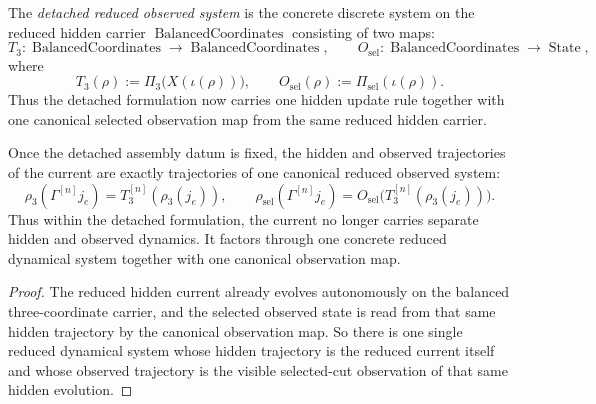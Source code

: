 \begin{definition}
\label{def:detached-reduced-observed-system}
The \emph{detached reduced observed system} is the concrete discrete system on
the reduced hidden carrier \(\operatorname{BalancedCoordinates}\) consisting of
two maps:
\[
T_3 : \operatorname{BalancedCoordinates}\to\operatorname{BalancedCoordinates},
\qquad
O_{\mathrm{sel}} : \operatorname{BalancedCoordinates}\to\operatorname{State},
\]
where
\[
T_3(\rho):=\Pi_3\!\bigl(X(\iota(\rho))\bigr),
\qquad
O_{\mathrm{sel}}(\rho):=\Pi_{\mathrm{sel}}(\iota(\rho)).
\]
Thus the detached formulation now carries one hidden update rule together with
one canonical selected observation map from the same reduced hidden carrier.
\end{definition}

\begin{corollary}
\label{thm:detached-current-trajectories-factor-through-the-reduced-observed-system}
Once the detached assembly datum is fixed, the hidden and observed trajectories
of the current are exactly trajectories of one canonical reduced observed
system:
\[
\rho_3(\Gamma^{[n]} j_e)=T_3^{[n]}(\rho_3(j_e)),
\qquad
\rho_{\mathrm{sel}}(\Gamma^{[n]} j_e)=
O_{\mathrm{sel}}\!\bigl(T_3^{[n]}(\rho_3(j_e))\bigr).
\]
Thus within the detached formulation, the current no longer carries separate
hidden and observed dynamics. It factors through one concrete reduced
dynamical system together with one canonical observation map.
\end{corollary}

\begin{proof}
The reduced hidden current already evolves autonomously on the balanced
three-coordinate carrier, and the selected observed state is read from that
same hidden trajectory by the canonical observation map. So there is one
single reduced dynamical system whose hidden trajectory is the reduced current
itself and whose observed trajectory is the visible selected-cut observation of
that same hidden evolution.
\end{proof}

